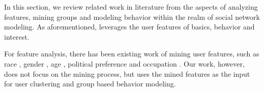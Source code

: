 

\par In this section, we review related work in literature from the aspects of analyzing features, mining groups and modeling behavior within the realm of social network modeling.
As aforementioned, \sys{} leverages the user features of basics, behavior and interest.

For feature analysis, there has been existing work of mining user features, such as race \cite{IEEEexample:conf/icwsm/PennacchiottiP11}, gender \cite{IEEEexample:conf/emnlp/CiotSR13}, age \cite{IEEEexample:conf/icde/ParkHHL09}, political preference \cite{IEEEexample:conf/icwsm/PennacchiottiP11,IEEEexample:conf/acl/VolkovaCD14} and occupation \cite{IEEEexample:conf/icde/FanCTWC16}.
Our work, however, does not focus on the mining process, but uses the mined features as the input for user clustering and group based behavior modeling.

